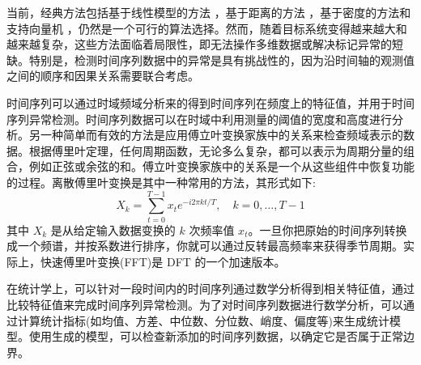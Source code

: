 当前，经典方法包括基于线性模型的方法\cite{yellow3} ，基于距离的方法\cite{yellow4} ，基于密度的方法\cite{yellow1}和支持向量机\cite{yellow6} ，仍然是一个可行的算法选择。然而，随着目标系统变得越来越大和越来越复杂，这些方法面临着局限性，即无法操作多维数据或解决标记异常的短缺。特别是，检测时间序列数据中的异常是具有挑战性的，因为沿时间轴的观测值之间的顺序和因果关系需要联合考虑。

时间序列可以通过时域频域分析来的得到时间序列在频度上的特征值，并用于时间序列异常检测。时间序列数据可以在时域中利用测量的阈值的宽度和高度进行分析。另一种简单而有效的方法是应用傅立叶变换家族中的关系来检查频域表示的数据。根据傅里叶定理，任何周期函数，无论多么复杂，都可以表示为周期分量的组合，例如正弦或余弦的和。傅立叶变换家族中的关系是一个从这些组件中恢复功能的过程。离散傅里叶变换是其中一种常用的方法，其形式如下:
\begin{equation}
    X_k=\sum_{t=0}^{T-1} x_t e^{-i 2 \pi k t / T}, \quad k=0, \ldots, T-1
    \end{equation}
其中 $X_k$ 是从给定输入数据变换的 $k$ 次频率值 $x_t$。一旦你把原始的时间序列转换成一个频谱，并按系数进行排序，你就可以通过反转最高频率来获得季节周期。实际上，快速傅里叶变换(FFT)是 DFT 的一个加速版本。

在统计学上，可以针对一段时间内的时间序列通过数学分析得到相关特征值，通过比较特征值来完成时间序列异常检测。为了对时间序列数据进行数学分析，可以通过计算统计指标(如均值、方差、中位数、分位数、峭度、偏度等)来生成统计模型。使用生成的模型，可以检查新添加的时间序列数据，以确定它是否属于正常边界。

